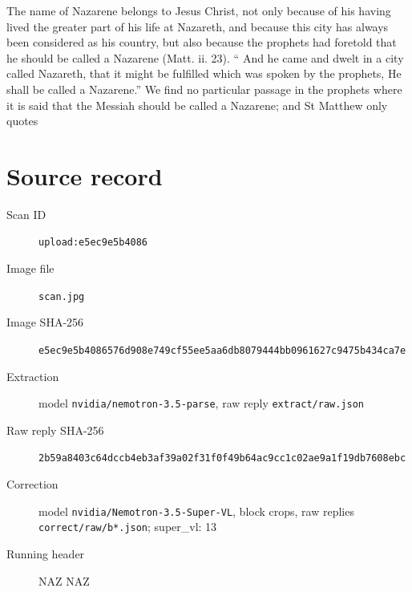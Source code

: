\documentclass{article}
\begin{document}
The name of Nazarene belongs to Jesus Christ, not only because of his having lived the greater part of his life at Nazareth, and because this city has always been considered as his country, but also because the prophets had foretold that he should be called a Nazarene (Matt. ii. 23). “ And he came and dwelt in a city called Nazareth, that it might be fulfilled which was spoken by the prophets, He shall be called a Nazarene.” We find no particular passage in the prophets where it is said that the Messiah should be called a Nazarene; and St Matthew only quotes


\section*{Source record}
\begin{description}
\item[Scan ID] \texttt{upload:e5ec9e5b4086}
\item[Image file] \texttt{scan.jpg}
\item[Image SHA-256] \texttt{e5ec9e5b4086576d908e749cf55ee5aa6db8079444bb0961627c9475b434ca7e}
\item[Extraction] model \texttt{nvidia/nemotron-3.5-parse}, raw reply \texttt{extract/raw.json}
\item[Raw reply SHA-256] \texttt{2b59a8403c64dccb4eb3af39a02f31f0f49b64ac9cc1c02ae9a1f19db7608ebc}
\item[Correction] model \texttt{nvidia/Nemotron-3.5-Super-VL}, block crops, raw replies \texttt{correct/raw/b*.json}; super\_vl: 13
\item[Running header] NAZ NAZ
\end{description}
\end{document}
